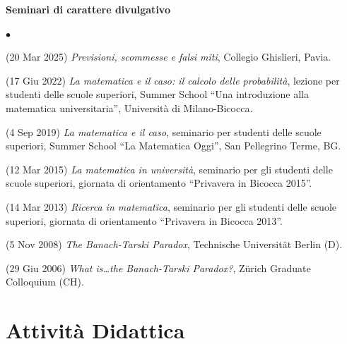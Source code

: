 \documentclass[a4paper,11pt,oneside]{amsart}
\newenvironment{myitemize}{%
\begin{list}{$\bullet$}%
 	{%
	\setlength{\itemsep}{0.3em}%
	\setlength{\topsep}{0.3em}%
	\setlength{\partopsep}{0em}%
	\setlength{\parsep}{0em}%
	\setlength{\parskip}{0em}%
	\setlength\leftmargin{1.5em}%
	\setlength\labelwidth{1.1em}%
	\setlength{\labelsep}{0.4em}%
	}%
	}%
{\end{list}}
\renewenvironment{itemize}{
\begin{myitemize}}%
{\end{myitemize}}
\begin{document}

\medskip
{\large\sf \bfseries Seminari di carattere divulgativo}
\smallskip

\begin{itemize}
\item (20 Mar 2025)
\emph{Previsioni, scommesse e falsi miti},
Collegio Ghislieri, Pavia.

\item (17 Giu 2022) \emph{La matematica e il caso: il calcolo delle probabilità},
lezione per studenti delle scuole superiori,
Summer School ``Una introduzione alla matematica universitaria'',
Università di Milano-Bicocca.

\item (4 Sep 2019) \emph{La matematica e il caso},
seminario per studenti delle scuole superiori,
Summer School ``La Matematica Oggi'',
San Pellegrino Terme, BG.

\item (12 Mar 2015) \emph{La matematica in università},
seminario per gli studenti delle scuole superiori, giornata di orientamento
``Privavera in Bicocca 2015''.

\item (14 Mar 2013) \emph{Ricerca in matematica},
seminario per gli studenti delle scuole superiori, giornata di orientamento
``Privavera in Bicocca 2013''.

\item (5 Nov 2008) \emph{The Banach-Tarski Paradox},
Technische Universit\"at Berlin (D).

\item (29 Giu 2006) \emph{What is\ldots the Banach-Tarski Paradox?},
Z\"urich Graduate Colloquium (CH).
\end{itemize}



\section{Attività Didattica}

\nopagebreak


%
%
\end{document}
